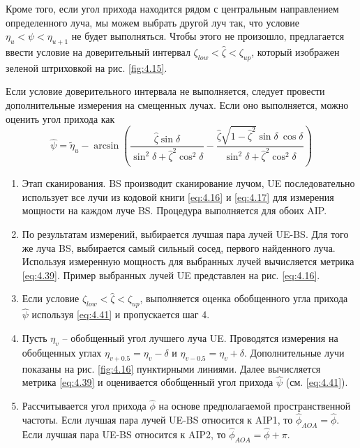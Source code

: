 Кроме того, если угол прихода находится рядом с центральным направлением определенного
луча, мы можем выбрать другой луч так, что условие $\eta_u<\psi < \eta_{u+1}$ не будет выполняться.
Чтобы этого не произошло, предлагается ввести условие на доверительный интервал
$\zeta_{low}<\hat \zeta < \zeta_{up}$, который изображен зеленой штриховкой  на рис.
\ref{fig:4.15}.

Если условие доверительного интервала не выполняется, следует провести дополнительные измерения на смещенных лучах.
Если оно выполняется, можно оценить угол прихода как
\begin{equation}
    \label{eq:4.41}
    \hat \psi = \tilde \eta_u - \arcsin(
    \frac{\hat \zeta \sin\delta}{\sin^2\delta + \hat \zeta^2 \cos^2\delta} -
    \frac{\hat \zeta \sqrt{1- \hat \zeta^2} \sin\delta\ \cos\delta}{\sin^2\delta + \hat \zeta^2 \cos^2\delta}
    )
\end{equation}
\begin{enumerate}[label=\textbf{Шаг \arabic*:}]
    \item Этап сканирования. BS производит сканирование лучом, UE
          последовательно использует все лучи из кодовой книги \eqref{eq:4.16} и \eqref{eq:4.17} для
          измерения мощности на каждом луче BS. Процедура выполняется для обоих AIP.
    \item По результатам измерений, выбирается лучшая пара лучей UE-BS. Для того же луча BS,
          выбирается самый сильный сосед, первого найденного луча. Используя измеренную мощность для выбранных лучей
          вычисляется метрика \eqref{eq:4.39}. Пример выбранных лучей UE представлен на рис. \ref{eq:4.16}.
    \item Если условие $\zeta_{low} < \hat \zeta < \zeta_{up}$, выполняется оценка обобщенного угла прихода $\hat \psi$ используя \eqref{eq:4.41} и пропускается шаг 4.
    \item Пусть $\eta_v$ -- обобщенный угол лучшего луча UE. Проводятся измерения на обобщенных углах
          $\eta_{v+0.5} = \eta_v - \delta$ и
          $\eta_{v-0.5} = \eta_v + \delta$. Дополнительные лучи показаны на рис. \ref{fig:4.16} пунктирными линиями. Далее вычисляется метрика \eqref{eq:4.39}
          и оценивается обобщенный угол прихода $\hat \psi$ (см. \eqref{eq:4.41}).
    \item Рассчитывается угол прихода $\hat \phi$ на основе предполагаемой пространственной частоты. Если лучшая пара лучей UE-BS
          относится к AIP1, то $\hat \phi_{AOA} = \hat \phi$. Если лучшая пара UE-BS относится к AIP2, то $\hat \phi_{AOA} = \hat \phi + \pi$.
\end{enumerate}

